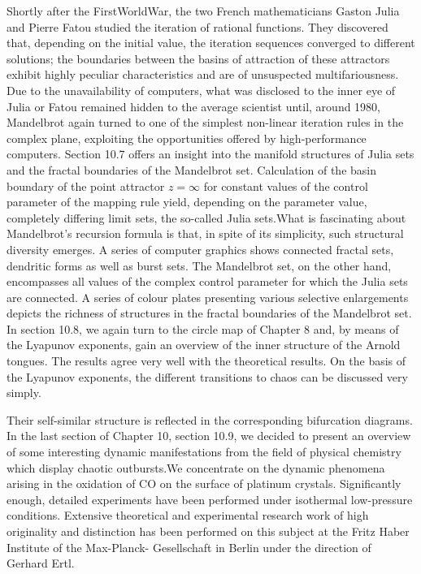 \documentclass[12pt]{article}
\begin{document}
Shortly after the FirstWorldWar, the two French mathematicians Gaston Julia and
Pierre Fatou studied the iteration of rational functions. They discovered that, depending
on the initial value, the iteration sequences converged to different solutions;
the boundaries between the basins of attraction of these attractors exhibit highly
peculiar characteristics and are of unsuspected multifariousness. Due to the unavailability
of computers, what was disclosed to the inner eye of Julia or Fatou remained
hidden to the average scientist until, around 1980, Mandelbrot again turned to one
of the simplest non-linear iteration rules in the complex plane, exploiting the opportunities
offered by high-performance computers. Section 10.7 offers an insight into
the manifold structures of Julia sets and the fractal boundaries of the Mandelbrot
set. Calculation of the basin boundary of the point attractor $z= \infty$ for constant values
of the control parameter of the mapping rule yield, depending on the parameter
value, completely differing limit sets, the so-called Julia sets.What is fascinating
about Mandelbrot’s recursion formula is that, in spite of its simplicity, such structural
diversity emerges. A series of computer graphics shows connected fractal sets,
dendritic forms as well as burst sets. The Mandelbrot set, on the other hand, encompasses
all values of the complex control parameter for which the Julia sets are
connected. A series of colour plates presenting various selective enlargements depicts
the richness of structures in the fractal boundaries of the Mandelbrot set.
In section 10.8, we again turn to the circle map of Chapter 8 and, by means of the
Lyapunov exponents, gain an overview of the inner structure of the Arnold tongues.
The results agree very well with the theoretical results. On the basis of the Lyapunov
exponents, the different transitions to chaos can be discussed very simply.

\hfill

Their self-similar structure is reflected in the corresponding bifurcation diagrams.
In the last section of Chapter 10, section 10.9, we decided to present an overview of
some interesting dynamic manifestations from the field of physical chemistry which
display chaotic outbursts.We concentrate on the dynamic phenomena arising in the
oxidation of CO on the surface of platinum crystals. Significantly enough, detailed
experiments have been performed under isothermal low-pressure conditions. Extensive
theoretical and experimental research work of high originality and distinction
has been performed on this subject at the Fritz Haber Institute of the Max-Planck-
Gesellschaft in Berlin under the direction of Gerhard Ertl.
\end{document}
